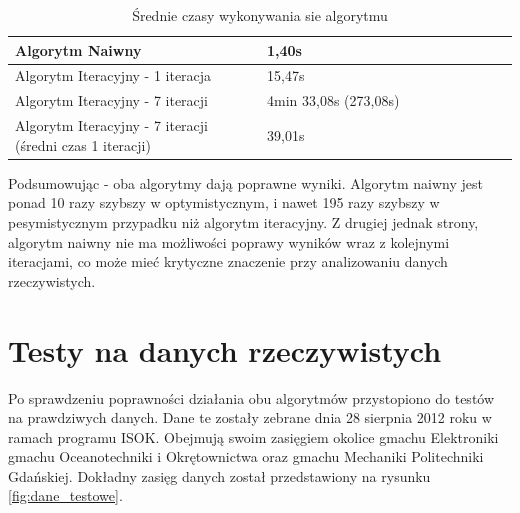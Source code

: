 \begin{table}[h!]
    \centering
    \begin{tabular}{|p{0.5\linewidth}|p{0.5\linewidth}|}
        \hline
        Algorytm Naiwny & 1,40s \\
        \hline
        Algorytm Iteracyjny - 1 iteracja & 15,47s \\
        \hline
        Algorytm Iteracyjny - 7 iteracji & 4min 33,08s (273,08s) \\
        \hline
        Algorytm Iteracyjny - 7 iteracji (średni czas 1 iteracji) & 39,01s \\
        \hline
    \end{tabular}
    \caption{Średnie czasy wykonywania sie algorytmu}
    \label{tab:czasy1}
\end{table}

Podsumowując - oba algorytmy dają poprawne wyniki. Algorytm naiwny jest ponad 10 razy szybszy w optymistycznym,
i nawet 195 razy szybszy w pesymistycznym przypadku niż algorytm iteracyjny. Z drugiej jednak strony, algorytm
naiwny nie ma możliwości poprawy wyników wraz z kolejnymi iteracjami, co może mieć krytyczne znaczenie przy
analizowaniu danych rzeczywistych.

\section{Testy na danych rzeczywistych}

Po sprawdzeniu poprawności działania obu algorytmów przystopiono do testów na prawdziwych danych.
Dane te zostały zebrane dnia 28 sierpnia 2012 roku w ramach programu ISOK. Obejmują swoim zasięgiem okolice
gmachu Elektroniki gmachu Oceanotechniki i Okrętownictwa oraz gmachu Mechaniki Politechniki Gdańskiej.
Dokładny zasięg danych został przedstawiony na rysunku \ref{fig:dane_testowe}.

